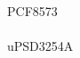 \documentclass[10pt,a4paper,final]{article}
\begin{document}
\begin{spacing}{1.5}
\begin{multicols}{3}
PCF8573\\
 \\
uPSD3254A\\

\end{multicols}
\end{spacing}
\end{document}
